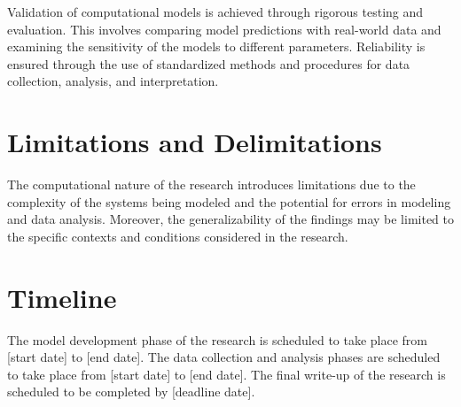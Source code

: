 Validation of computational models is achieved through rigorous testing and evaluation. This involves comparing model predictions with real-world data and examining the sensitivity of the models to different parameters. Reliability is ensured through the use of standardized methods and procedures for data collection, analysis, and interpretation.

\section{Limitations and Delimitations}

The computational nature of the research introduces limitations due to the complexity of the systems being modeled and the potential for errors in modeling and data analysis. Moreover, the generalizability of the findings may be limited to the specific contexts and conditions considered in the research.

\section{Timeline}

The model development phase of the research is scheduled to take place from [start date] to [end date]. The data collection and analysis phases are scheduled to take place from [start date] to [end date]. The final write-up of the research is scheduled to be completed by [deadline date].